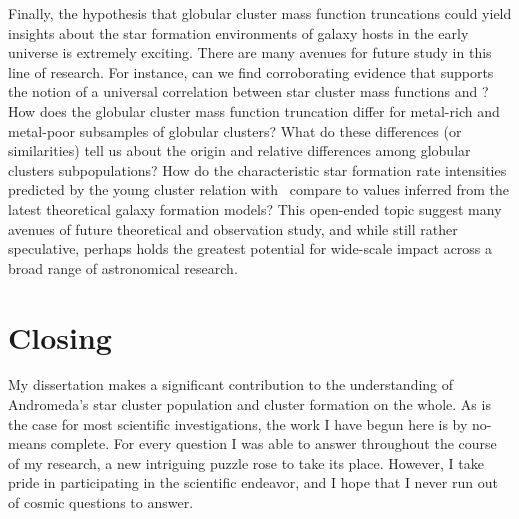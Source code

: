Finally, the hypothesis that globular cluster mass function truncations could yield insights about the star formation environments of galaxy hosts in the early universe is extremely exciting.  There are many avenues for future study in this line of research.  For instance, can we find corroborating evidence that supports the notion of a universal correlation between star cluster mass functions and \SigSFR?  How does the globular cluster mass function truncation differ for metal-rich and metal-poor subsamples of globular clusters?  What do these differences (or similarities) tell us about the origin and relative differences among globular clusters subpopulations?  How do the characteristic star formation rate intensities predicted by the young cluster relation with \SigSFR\ compare to values inferred from the latest theoretical galaxy formation models?  This open-ended topic suggest many avenues of future theoretical and observation study, and while still rather speculative, perhaps holds the greatest potential for wide-scale impact across a broad range of astronomical research.

\section{Closing}

My dissertation makes a significant contribution to the understanding of Andromeda's star cluster population and cluster formation on the whole.  As is the case for most scientific investigations, the work I have begun here is by no-means complete.  For every question I was able to answer throughout the course of my research, a new intriguing puzzle rose to take its place.  However, I take pride in participating in the scientific endeavor, and I hope that I never run out of cosmic questions to answer.
